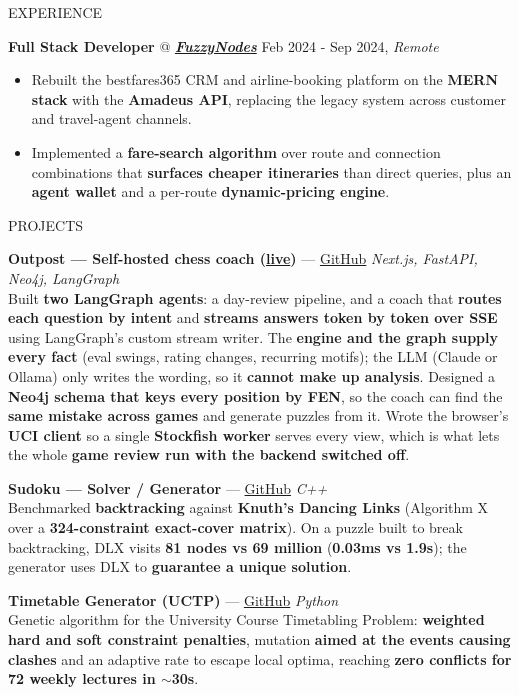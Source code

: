 \documentclass{resume} %
\makeatletter
\newcommand{\experience}[5]{
    \textbf{#1} @ \textit{\textbf{#2}} \hfill #3, \textit{#4}
    \vspace{-7pt}
    \begin{itemize}[leftmargin=*]
        \itemsep -7pt {}
        #5
    \end{itemize}
    \vspace{-4pt}
}
\newcommand{\project}[4]{
    \item \textbf{#1} --- \href{#2}{GitHub} \hfill \textit{#3}\\
    #4
    \vspace{-5pt}
}
\makeatother
\begin{document}
\begin{rSection}{EXPERIENCE}
\experience{Full Stack Developer}{\href{https://bestfares365.com.au}{FuzzyNodes}}{Feb 2024 - Sep 2024}{Remote}{
    \item Rebuilt the bestfares365 CRM and airline-booking platform on the \textbf{MERN stack} with the \textbf{Amadeus API}, replacing the legacy system across customer and travel-agent channels.
    \item Implemented a \textbf{fare-search algorithm} over route and connection combinations that \textbf{surfaces cheaper itineraries} than direct queries, plus an \textbf{agent wallet} and a per-route \textbf{dynamic-pricing engine}.
}

\end{rSection}

\vspace{-1pt}
\begin{rSection}{PROJECTS}
\vspace{-12pt}

\project{Outpost --- Self-hosted chess coach (\href{https://chess-outpost.vercel.app/}{live})}{https://github.com/MubashirTanwar/outpost}{Next.js, FastAPI, Neo4j, LangGraph}{
    Built \textbf{two LangGraph agents}: a day-review pipeline, and a coach that \textbf{routes each question by intent} and \textbf{streams answers token by token over SSE} using LangGraph's custom stream writer. The \textbf{engine and the graph supply every fact} (eval swings, rating changes, recurring motifs); the LLM (Claude or Ollama) only writes the wording, so it \textbf{cannot make up analysis}. Designed a \textbf{Neo4j schema that keys every position by FEN}, so the coach can find the \textbf{same mistake across games} and generate puzzles from it. Wrote the browser's \textbf{UCI client} so a single \textbf{Stockfish worker} serves every view, which is what lets the whole \textbf{game review run with the backend switched off}.
}
\project{Sudoku --- Solver / Generator}{https://github.com/MubashirTanwar/Sudoku}{C++}{
    Benchmarked \textbf{backtracking} against \textbf{Knuth's Dancing Links} (Algorithm X over a \textbf{324-constraint exact-cover matrix}). On a puzzle built to break backtracking, DLX visits \textbf{81 nodes vs 69 million} (\textbf{0.03ms vs 1.9s}); the generator uses DLX to \textbf{guarantee a unique solution}.
}
\project{Timetable Generator (UCTP)}{https://github.com/MubashirTanwar/Timetable}{Python}{
    Genetic algorithm for the University Course Timetabling Problem: \textbf{weighted hard and soft constraint penalties}, mutation \textbf{aimed at the events causing clashes} and an adaptive rate to escape local optima, reaching \textbf{zero conflicts for 72 weekly lectures in $\sim$30s}.
}

\end{rSection}
\end{document}
